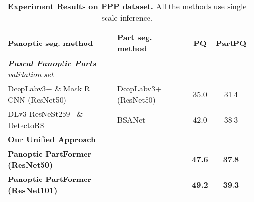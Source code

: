 \begin{table}[t]
\centering
\begin{adjustbox}{width=0.50\textwidth}
\begin{tabular}{ll||cc}
\toprule[0.15em]
\textbf{Panoptic seg. method}  &  \textbf{Part seg. method}  & PQ & PartPQ \\ 
\midrule
\textit{\textbf{Pascal Panoptic Parts} validation set} \\
DeepLabv3+ \& Mask R-CNN \cite{maskrcnn}(ResNet50) & DeepLabv3+ \cite{deeplabv3plus}(ResNet50) & 35.0  &  31.4   \\ 
DLv3-ResNeSt269~\cite{zhang2020resnest} \& DetectoRS \cite{qiao2021detectors} &  BSANet \cite{Zhao2019BSANet}  & 42.0  & 38.3  \\ \hline
\textbf{Our Unified Approach} \\
\textbf{Panoptic PartFormer (ResNet50)} &  & \textbf{47.6} & \textbf{37.8} \\
\textbf{Panoptic PartFormer (ResNet101)} & & \textbf{49.2} & \textbf{39.3} \\
\bottomrule
\end{tabular}
\end{adjustbox}
\caption{\textbf{Experiment Results on PPP dataset.} All the methods use single scale inference.}
\label{tab:experiments_res_ppp}
\end{table}

